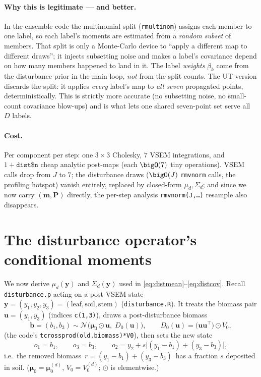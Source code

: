 \documentclass[11pt]{article}
\newcommand{\code}[1]{\texttt{#1}}
\newcommand{\by}{\bm{y}}
\newcommand{\bm}[1]{\boldsymbol{#1}}
\newcommand{\bmu}{\bm{\mu}}
\begin{document}
\paragraph{Why this is legitimate --- and better.} In the ensemble code the multinomial
split (\code{rmultinom}) assigns each member to one label, so each label's moments are
estimated from a \emph{random subset} of members. That split is only a Monte-Carlo device
to ``apply a different map to different draws''; it injects subsetting noise and makes a
label's covariance depend on how many members happened to land in it. The label
\emph{weights} $\beta_k$ come from the disturbance prior in the main loop, \emph{not} from
the split counts. The UT version discards the split: it applies \emph{every} label's map
to \emph{all seven} propagated points, deterministically. This is strictly more accurate
(no subsetting noise, no small-count covariance blow-ups) and is what lets one shared
seven-point set serve all $D$ labels.

\paragraph{Cost.} Per component per step: one $3\times3$ Cholesky, $7$ VSEM integrations,
and $1+\code{dist\$n}$ cheap analytic post-maps (each $\bigO(7)$ tiny operations). VSEM
calls drop from $J$ to $7$; the disturbance draws ($\bigO(J)$ \code{rmvnorm} calls, the
profiling hotspot) vanish entirely, replaced by closed-form $\mu_d,\Sigma_d$; and since
we now carry $(\bm m,\bm P)$ directly, the per-step analysis \code{rmvnorm(J,\dots)}
resample also disappears.

\section{The disturbance operator's conditional moments}
\label{sec:disturb}

We now derive $\mu_d(\by)$ and $\Sigma_d(\by)$ used in
\eqref{eq:distmean}--\eqref{eq:distcov}. Recall \code{disturbance.p} acting on a
post-VSEM state $\by=(y_1,y_2,y_3)=(\text{leaf},\text{soil},\text{stem})$
(\code{disturbance.R}). It treats the biomass pair $\bm u=(y_1,y_3)$ (indices
\code{c(1,3)}), draws a post-disturbance biomass
\begin{equation}
\label{eq:draw}
\bm b=(b_1,b_3)\sim\mathcal N\!\big(\bmu_0\odot\bm u,\; D_0(\bm u)\big),
\qquad D_0(\bm u)=\big(\bm u\bm u^\top\big)\odot V_0,
\end{equation}
(the code's \code{tcrossprod(old.biomass)*V0}), then sets the new state
\begin{equation}
\label{eq:newstate}
o_1=b_1,\qquad o_3=b_3,\qquad o_2=y_2+s\big[(y_1-b_1)+(y_3-b_3)\big],
\end{equation}
i.e.\ the removed biomass $\,r=(y_1-b_1)+(y_3-b_3)\,$ has a fraction $s$ deposited in
soil. ($\bmu_0=\bmu_0^{(d)}$, $V_0=V_0^{(d)}$; $\odot$ is elementwise.)
\end{document}
